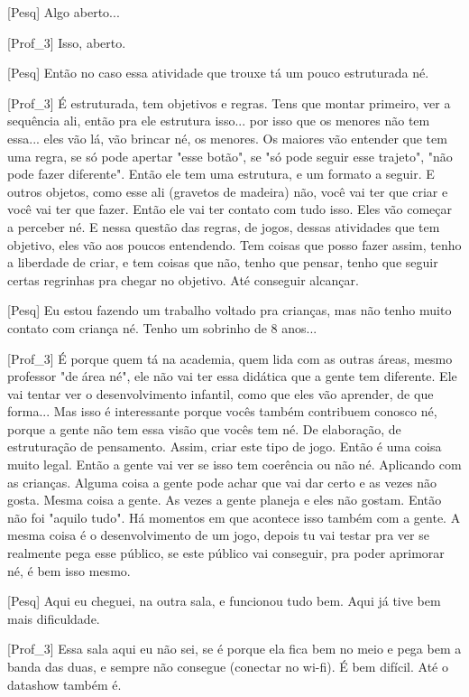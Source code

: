 [Pesq] Algo aberto...

[Prof\_3] Isso, aberto. 

[Pesq] Então no caso essa atividade que trouxe tá um pouco estruturada né.

[Prof\_3] É estruturada, tem objetivos e regras. Tens que montar primeiro, ver a sequência ali, então pra ele estrutura isso... por isso que os menores não tem essa... eles vão lá, vão brincar né, os menores. Os maiores vão entender que tem uma regra, se só pode apertar "esse botão", se "só pode seguir esse trajeto", "não pode fazer diferente". Então ele tem uma estrutura, e um formato a seguir. E outros objetos, como esse ali (gravetos de madeira) não, você vai ter que criar e você vai ter que fazer. Então ele vai ter contato com tudo isso. Eles vão começar a perceber né. E nessa questão das regras, de jogos, dessas atividades que tem objetivo, eles vão aos poucos entendendo. Tem coisas que posso fazer assim, tenho a liberdade de criar, e tem coisas que não, tenho que pensar, tenho que seguir certas regrinhas pra chegar no objetivo. Até conseguir alcançar.

[Pesq] Eu estou fazendo um trabalho voltado pra crianças, mas não tenho muito contato com criança né. Tenho um sobrinho de 8 anos...

[Prof\_3] É porque quem tá na academia, quem lida com as outras áreas, mesmo professor "de área né", ele não vai ter essa didática que a gente tem diferente. Ele vai tentar ver o desenvolvimento infantil, como que eles vão aprender, de que forma... Mas isso é interessante porque vocês também contribuem conosco né, porque a gente não tem essa visão que vocês tem né. De elaboração, de estruturação de pensamento. Assim, criar este tipo de jogo. Então é uma coisa muito legal. Então a gente vai ver se isso tem coerência ou não né. Aplicando com as crianças. Alguma coisa a gente pode achar que vai dar certo e as vezes não gosta. Mesma coisa a gente. As vezes a gente planeja e eles não gostam. Então não foi "aquilo tudo". Há momentos em que acontece isso também com a gente. A mesma coisa é o desenvolvimento de um jogo, depois tu vai testar pra ver se realmente pega esse público, se este público vai conseguir, pra poder aprimorar né, é bem isso mesmo.

[Pesq] Aqui eu cheguei, na outra sala, e funcionou tudo bem. Aqui já tive bem mais dificuldade.

[Prof\_3] Essa sala aqui eu não sei, se é porque ela fica bem no meio e pega bem a banda das duas, e sempre não consegue (conectar no wi-fi). É bem difícil. Até o datashow também é.


